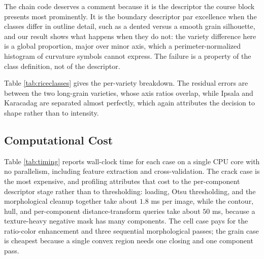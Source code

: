 \documentclass{ieeeaccess}
\begin{document}
The chain code deserves a comment because it is the descriptor the course block
presents most prominently. It is the boundary descriptor par excellence when the
classes differ in outline detail, such as a dented versus a smooth grain
silhouette, and our result shows what happens when they do not: the variety
difference here is a global proportion, major over minor axis, which a
perimeter-normalized histogram of curvature symbols cannot express. The failure
is a property of the class definition, not of the descriptor.

\begin{table}[!t]
\centering
\caption{Case 3, feature-group ablation, five-fold macro-F1 on \riceImages{}
grains. Ranking is by the better of the two classifiers.}
\label{tab:riceabl}
\footnotesize

\end{table}

Table \ref{tab:riceclasses} gives the per-variety breakdown. The residual errors
are between the two long-grain varieties, whose axis ratios overlap, while
Ipsala and Karacadag are separated almost perfectly, which again attributes the
decision to shape rather than to intensity.

\begin{table}[!t]
\centering
\caption{Case 3, per-variety scores of the \riceBest{} classifier.}
\label{tab:riceclasses}
\footnotesize

\end{table}

\subsection{Computational Cost}
\label{sec:cost}
Table \ref{tab:timing} reports wall-clock time for each case on a single CPU core
with no parallelism, including feature extraction and cross-validation. The crack
case is the most expensive, and profiling attributes that cost to the per-component
descriptor stage rather than to thresholding: loading, Otsu thresholding, and the
morphological cleanup together take about $1.8$ ms per image, while the contour,
hull, and per-component distance-transform queries take about $50$ ms, because a
texture-heavy negative mask has many components. The cell case pays for the
ratio-color enhancement and three sequential morphological passes; the grain case
is cheapest because a single convex region needs one closing and one component
pass.

\begin{table}[!t]
\centering
\caption{Measured wall-clock cost per case, single core, including feature
extraction and cross-validation.}
\label{tab:timing}
\footnotesize

\end{table}
\end{document}

